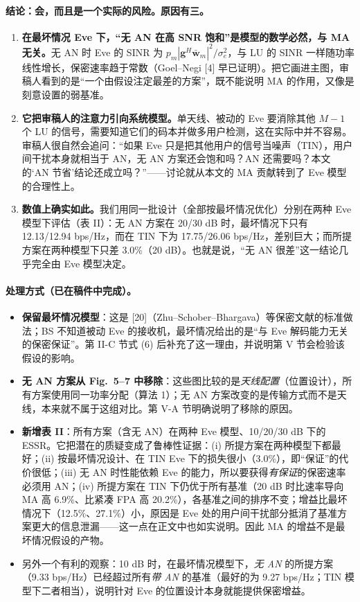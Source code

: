 \documentclass[11pt,a4paper]{ctexart}
\begin{document}
\paragraph{结论：会，而且是一个实际的风险。原因有三。}
\begin{enumerate}
\item \textbf{在最坏情况 Eve 下，“无 AN 在高 SNR 饱和”是模型的数学必然，与 MA 无关。}无 AN 时 Eve 的 SINR 为 $p_m|\mathbf g^H\bar{\mathbf w}_m|^2/\sigma_e^2$，与 LU 的 SINR 一样随功率线性增长，保密速率趋于常数（Goel--Negi [4] 早已证明）。把它画进主图，审稿人看到的是“一个由假设注定最差的方案”，既不能说明 MA 的作用，又像是刻意设置的弱基准。
\item \textbf{它把审稿人的注意力引向系统模型。}单天线、被动的 Eve 要消除其他 $M-1$ 个 LU 的信号，需要知道它们的码本并做多用户检测，这在实际中并不容易。审稿人很自然会追问：“如果 Eve 只是把其他用户的信号当噪声（TIN），用户间干扰本身就相当于 AN，无 AN 方案还会饱和吗？AN 还需要吗？本文的‘AN 节省’结论还成立吗？”——讨论就从本文的 MA 贡献转到了 Eve 模型的合理性上。
\item \textbf{数值上确实如此。}我们用同一批设计（全部按最坏情况优化）分别在两种 Eve 模型下评估（表 II）：无 AN 方案在 20/30 dB 时，最坏情况下只有 12.13/12.94 bps/Hz，而在 TIN 下为 17.75/26.06 bps/Hz，差别巨大；而所提方案在两种模型下只差 3.0\%（20 dB）。也就是说，“无 AN 很差”这一结论几乎完全由 Eve 模型决定。
\end{enumerate}

\paragraph{处理方式（已在稿件中完成）。}
\begin{itemize}
\item \textbf{保留最坏情况模型}：这是 [20]（Zhu--Schober--Bhargava）等保密文献的标准做法；BS 不知道被动 Eve 的接收机，最坏情况给出的是“与 Eve 解码能力无关的保密保证”。第 II-C 节式 (6) 后补充了这一理由，并说明第 V 节会检验该假设的影响。
\item \textbf{无 AN 方案从 Fig.~5--7 中移除}：这些图比较的是\emph{天线配置}（位置设计），所有方案使用同一功率分配（算法 1）；无 AN 方案改变的是传输方式而不是天线，本来就不属于这组对比。第 V-A 节明确说明了移除的原因。
\item \textbf{新增表 II}：所有方案（含无 AN）在两种 Eve 模型、10/20/30 dB 下的 ESSR。它把潜在的质疑变成了鲁棒性证据：(i) 所提方案在两种模型下都最好；(ii) 按最坏情况设计、在 TIN Eve 下的损失很小（3.0\%），即“保证”的代价很低；(iii) 无 AN 时性能依赖 Eve 的能力，所以要获得\emph{有保证}的保密速率必须用 AN；(iv) 所提方案在 TIN 下仍优于所有基准（20 dB 时比速率导向 MA 高 6.9\%、比紧凑 FPA 高 20.2\%），各基准之间的排序不变；增益比最坏情况下（12.5\%、27.1\%）小，原因是 Eve 处的用户间干扰部分抵消了基准方案更大的信息泄漏——这一点在正文中也如实说明。因此 MA 的增益不是最坏情况假设的产物。
\item 另外一个有利的观察：10 dB 时，在最坏情况模型下，\emph{无 AN} 的所提方案（9.33 bps/Hz）已经超过所有\emph{带 AN} 的基准（最好的为 9.27 bps/Hz；TIN 模型下二者相当），说明针对 Eve 的位置设计本身就能提供保密增益。
\end{itemize}
\end{document}
